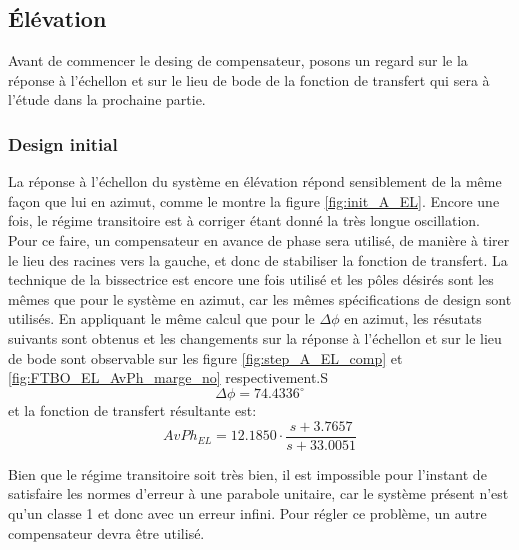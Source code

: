 \documentclass{udes_rapport} %
\begin{document}
\subsection{Élévation}
Avant de commencer le desing de compensateur, posons un regard sur le la réponse à l'échellon et sur le lieu de bode de la fonction de transfert qui sera à l'étude dans la prochaine partie.\\
\noindent\begin{minipage}{\textwidth}
 
\begin{minipage}{0.5\textwidth}
\end{minipage}%
\begin{minipage}{0.5\textwidth}
\end{minipage} 

\label{fig:init_A_EL} 
\end{minipage}
\subsubsection{Design initial}
La réponse à l'échellon du système en élévation répond sensiblement de la même façon que lui en azimut, comme le montre la figure \ref{fig:init_A_EL}.
Encore une fois, le régime transitoire est à corriger étant donné la très longue oscillation. Pour ce faire, un compensateur en avance de phase sera utilisé, de manière à tirer le lieu des racines vers la gauche, et donc de stabiliser la fonction de transfert. La technique de la bissectrice est encore une fois utilisé et les pôles désirés sont les mêmes que pour le système en azimut, car les mêmes spécifications de design sont utilisés. En appliquant le même calcul que pour le $\Delta \phi$ en azimut, les résutats suivants sont obtenus et les changements sur la réponse à l'échellon et sur le lieu de bode sont observable sur les figure \ref{fig:step_A_EL_comp} et \ref{fig:FTBO_EL_AvPh_marge_no} respectivement.S
\[\Delta \phi = 74.4336^\circ\]
et la fonction de transfert résultante est:
\[AvPh_{EL} = 12.1850 \cdot \frac{s+3.7657}{s+33.0051}\]

Bien que le régime transitoire soit très bien, il est impossible pour l'instant de satisfaire les normes d'erreur à une parabole unitaire, car le système présent n'est qu'un classe 1 et donc avec un erreur infini. Pour régler ce problème, un autre compensateur devra être utilisé.
\end{document}
